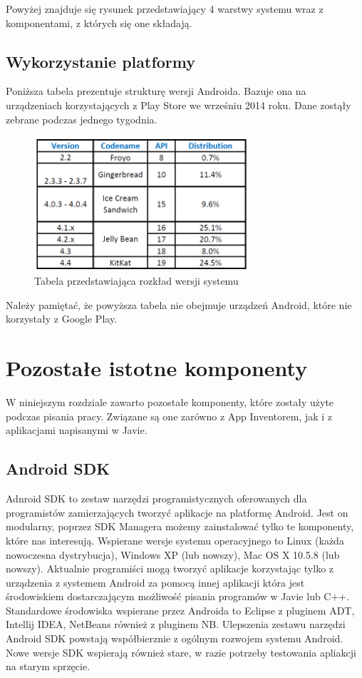 Powyżej znajduje się rysunek przedstawiający 4 warstwy systemu wraz z komponentami, z których się one składają.

\subsection{Wykorzystanie platformy}

Poniższa tabela prezentuje strukturę wersji Androida. Bazuje ona na  urządzeniach korzystających z Play Store we wrześniu 2014 roku. Dane zostąły zebrane podczas jednego tygodnia.\cite{android:38}

\begin{figure}[H] 
\centering\includegraphics[width=8cm]{figures/android/distributionChart}
\caption{Tabela przedstawiająca rozkład wersji systemu}
\end{figure}


Należy pamiętać, że powyższa tabela nie obejmuje urządzeń Android, które nie korzystały z Google Play.


\section{Pozostałe istotne komponenty}

W niniejszym rozdziale zawarto pozostałe komponenty, które zostały użyte podczas pisania pracy. Związane są one zarówno z App Inventorem, jak i z aplikacjami napisanymi w Javie.

\subsection{Android SDK}

Adnroid SDK to zestaw narzędzi programistycznych oferowanych dla programistów zamierzających tworzyć aplikacje na platformę Android. Jest on modularny, poprzez SDK Managera możemy zainstalować tylko te komponenty, które nas interesują.
Wspierane wersje systemu operacyjnego to Linux (każda nowoczesna dystrybucja), Windows XP (lub nowszy), Mac OS X 10.5.8 (lub nowszy). Aktualnie programiści mogą tworzyć aplikacje korzystając tylko z urządzenia z systemem Android za pomocą innej aplikacji która jest środowiskiem dostarczającym możliwość pisania programów w Javie lub C++. Standardowe środowiska wspierane przez Androida to Eclipse z pluginem ADT, Intellij IDEA, NetBeans również z pluginem NB.\cite{android:53} Ulepszenia zestawu narzędzi Android SDK powstają współbierznie z ogólnym rozwojem systemu Android. Nowe wersje SDK wspierają również stare, w razie potrzeby testowania apliakcji na starym sprzęcie. \cite{android:54}
 
